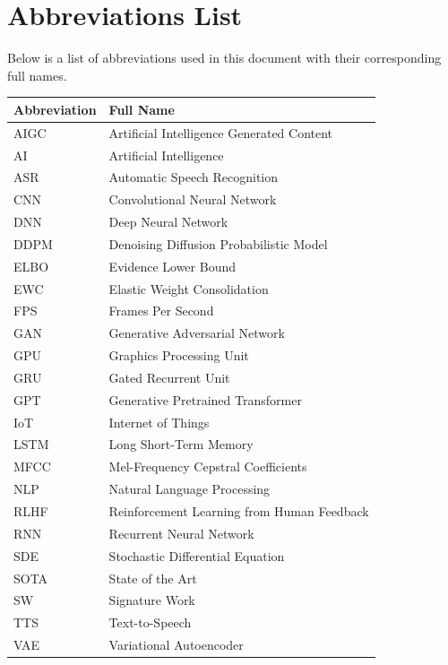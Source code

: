 \documentclass[11pt,a4paper,oneside]{report}
\begin{document}

\chapter*{Abbreviations List}
\label{appendix-abbreviations}

Below is a list of abbreviations used in this document with their corresponding full names.

\begin{longtable}{ll}
\textbf{Abbreviation} & \textbf{Full Name} \\
\endhead
AIGC & Artificial Intelligence Generated Content \\
AI & Artificial Intelligence \\
ASR & Automatic Speech Recognition \\
CNN & Convolutional Neural Network \\
DNN & Deep Neural Network \\
DDPM & Denoising Diffusion Probabilistic Model \\
ELBO & Evidence Lower Bound \\
EWC & Elastic Weight Consolidation \\
FPS & Frames Per Second \\
GAN & Generative Adversarial Network \\
GPU & Graphics Processing Unit \\
GRU & Gated Recurrent Unit \\
GPT & Generative Pretrained Transformer \\
IoT & Internet of Things \\
LSTM & Long Short-Term Memory \\
MFCC & Mel-Frequency Cepstral Coefficients \\
NLP & Natural Language Processing \\
RLHF & Reinforcement Learning from Human Feedback \\
RNN & Recurrent Neural Network \\
SDE & Stochastic Differential Equation \\
SOTA & State of the Art \\
SW & Signature Work \\
TTS & Text-to-Speech \\
VAE & Variational Autoencoder \\
\end{longtable}

\clearpage
{}
\end{document}
